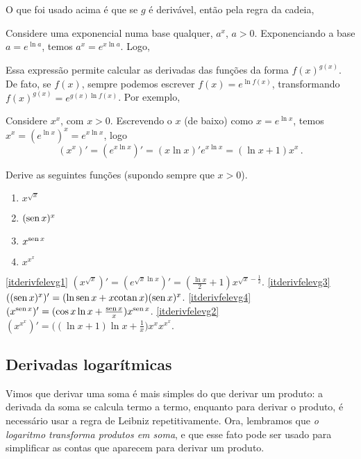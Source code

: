 O que foi usado acima é que
se $g$ é derivável, então pela regra da cadeia,

\begin{ex}
Considere uma exponencial numa base qualquer, $a^x$, $a>0$. Exponenciando
a base $a=e^{\ln a}$, temos $a^x=e^{x\ln a}$. Logo, 
\end{ex}

Essa expressão permite calcular as derivadas das funções da forma 
$f(x)^{g(x)}$. De fato, se $f(x)$, sempre podemos escrever
$f(x)=e^{\ln f(x)}$, transformando $f(x)^{g(x)}=e^{g(x)\ln f(x)}$. 
Por exemplo, 

\begin{ex} Considere $x^x$, com $x>0$.
Escrevendo o $x$ (de baixo) como $x=e^{\ln x}$, temos $x^x=(e^{\ln
x})^x=e^{x\ln x}$, logo
$$(x^x)'=(e^{x\ln x})'=(x\ln x)'e^{x\ln x}=(\ln x+1)x^x\,.$$
\end{ex}

\begin{exo}
Derive as seguintes funções (supondo sempre que $x>0$).
\begin{multicols}{4}
\begin{enumerate}
\item\label{itderivfelevg1} $x^{\sqrt{x}}$
\item\label{itderivfelevg3} $(\operatorname{sen} x)^x$
\item\label{itderivfelevg4} $x^{\operatorname{sen} x}$
\item\label{itderivfelevg2} $x^{x^x}$
\end{enumerate}
\end{multicols}
\vspace{0.01cm}
\begin{sol}
\eqref{itderivfelevg1} 
$(x^{\sqrt{x}})'=(e^{\sqrt{x}\ln x})'=(\frac{\ln x}{2}+1){
x^{\sqrt{x}-\frac12}}$.
\eqref{itderivfelevg3} $((\operatorname{sen} x)^x)'=(\ln \operatorname{sen} x+x{\rm cotan\,} x)(\operatorname{sen} x)^x$.
\eqref{itderivfelevg4} $(x^{\operatorname{sen} x})'=(\cos x\ln x+\frac{\operatorname{sen} x}{x})x^{\operatorname{sen} x}$.
\eqref{itderivfelevg2} $(x^{x^x})'=\bigl((\ln x+1)\ln
x+\frac1x\bigr)x^xx^{x^x}$.
\end{sol}
\end{exo}

\subsection{Derivadas logarítmicas}
Vimos que derivar uma soma é mais simples do que derivar um produto: a derivada da
soma se calcula termo a termo, enquanto para derivar o produto, é necessário
usar a regra de Leibniz repetitivamente.
Ora, lembramos que \emph{o logaritmo transforma produtos em soma}, e que esse
fato pode ser usado para simplificar as contas que aparecem para derivar um
produto. \\


